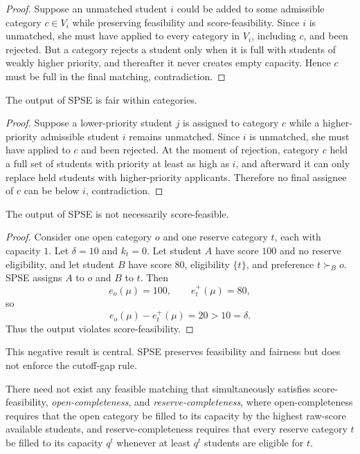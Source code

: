 \documentclass[runningheads]{llncs}
\newcommand{\1}{\mathbf{1}}
\begin{document}
\begin{proof}
Suppose an unmatched student $i$ could be added to some admissible category $c\in V_i$ while preserving feasibility and score-feasibility. Since $i$ is unmatched, she must have applied to every category in $V_i$, including $c$, and been rejected. But a category rejects a student only when it is full with students of weakly higher priority, and thereafter it never creates empty capacity. Hence $c$ must be full in the final matching, contradiction.
\end{proof}

\begin{proposition}
The output of SPSE is fair within categories.
\end{proposition}

\begin{proof}
Suppose a lower-priority student $j$ is assigned to category $c$ while a higher-priority admissible student $i$ remains unmatched. Since $i$ is unmatched, she must have applied to $c$ and been rejected. At the moment of rejection, category $c$ held a full set of students with priority at least as high as $i$, and afterward it can only replace held students with higher-priority applicants. Therefore no final assignee of $c$ can be below $i$, contradiction.
\end{proof}

\begin{proposition}
The output of SPSE is not necessarily score-feasible.
\end{proposition}

\begin{proof}
Consider one open category $o$ and one reserve category $t$, each with capacity $1$. Let $\delta=10$ and $k_t=0$. Let student $A$ have score $100$ and no reserve eligibility, and let student $B$ have score $80$, eligibility $\{t\}$, and preference $t\succ_B o$. SPSE assigns $A$ to $o$ and $B$ to $t$. Then
\[
e_o(\mu)=100,\qquad e_t^+(\mu)=80,
\]
so
\[
e_o(\mu)-e_t^+(\mu)=20>10=\delta.
\]
Thus the output violates score-feasibility.
\end{proof}

This negative result is central. SPSE preserves feasibility and fairness but does not enforce the cutoff-gap rule.

\begin{proposition}
\label{prop:impossibility}
There need not exist any feasible matching that simultaneously satisfies score-feasibility, \emph{open-completeness}, and \emph{reserve-completeness}, where open-completeness requires that the open category be filled to its capacity by the highest raw-score available students, and reserve-completeness requires that every reserve category $t$ be filled to its capacity $q^t$ whenever at least $q^t$ students are eligible for $t$.
\end{proposition}
\end{document}
